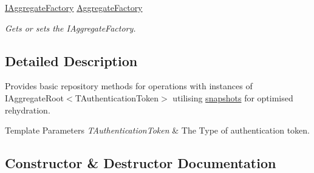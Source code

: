 \begin{DoxyCompactItemize}
\hyperlink{interfaceCqrs_1_1Domain_1_1Factories_1_1IAggregateFactory}{I\+Aggregate\+Factory} \hyperlink{classCqrs_1_1Snapshots_1_1SnapshotRepository_a833748fa79fd234067b61927c57bc60f_a833748fa79fd234067b61927c57bc60f}{Aggregate\+Factory}
\begin{DoxyCompactList}\small\item\em Gets or sets the I\+Aggregate\+Factory. \end{DoxyCompactList}\end{DoxyCompactItemize}


\subsection{Detailed Description}
Provides basic repository methods for operations with instances of I\+Aggregate\+Root$<$\+T\+Authentication\+Token$>$ utilising \hyperlink{classCqrs_1_1Snapshots_1_1Snapshot}{snapshots} for optimised rehydration. 


\begin{DoxyTemplParams}{Template Parameters}
{\em T\+Authentication\+Token} & The Type of authentication token.\\
\hline
\end{DoxyTemplParams}


\subsection{Constructor \& Destructor Documentation}
\mbox{\label{classCqrs_1_1Snapshots_1_1SnapshotRepository_afb7a64a747064d1f1fa1f58e36d05d78_afb7a64a747064d1f1fa1f58e36d05d78}} 
